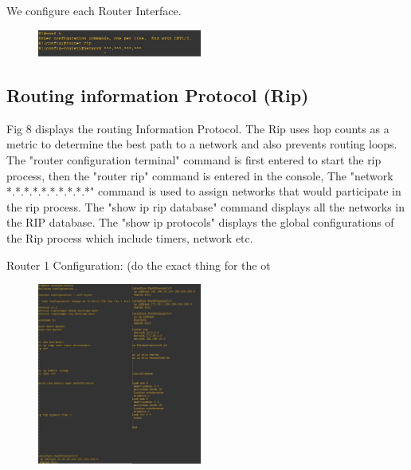 \documentclass{article}
\begin{document}
We configure each Router Interface.\\


\begin{figure}[H]
	\begin{center}
		\includegraphics[width=0.48\textwidth]{RouterRip.jpg}
	\end{center}
	\caption{\small  \newline}
	\label{fig:Prd}
\end{figure}
\subsection{Routing information Protocol (Rip)} Fig 8 displays the routing Information Protocol. The Rip uses hop counts as a metric to determine the best path to a network and also prevents routing loops. The "router configuration terminal" command is first entered to start the rip process, then the "router rip" command is entered in the console, The "network *.*.*.*.*.*.*.*.*.*" command is used to assign networks that would participate in the rip process. The "show ip rip database" command displays all the networks in the RIP database. The "show ip protocols" displays the global configurations of the Rip process which include timers, network etc.

Router 1 Configuration: (do the exact thing for the ot

\begin{figure}[H]
	\begin{center}
		\includegraphics[width=0.48\textwidth]{Routerconfig.jpg}
	\end{center}
	\caption{\small  \newline}
	\label{fig:Prd}
\end{figure}
\end{document}
